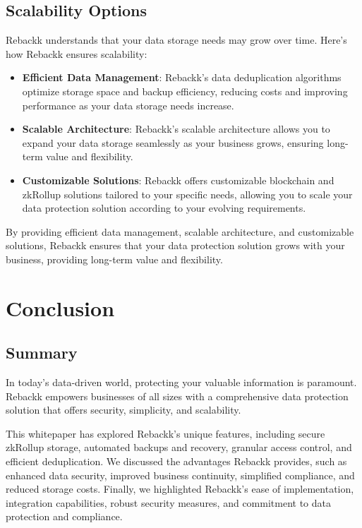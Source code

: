 \documentclass[12pt]{article}
\begin{document}
\subsection{Scalability Options}
Rebackk understands that your data storage needs may grow over time. Here's how Rebackk ensures scalability:

\begin{itemize}
    \item \textbf{Efficient Data Management}: Rebackk's data deduplication algorithms optimize storage space and backup efficiency, reducing costs and improving performance as your data storage needs increase.
    \item \textbf{Scalable Architecture}: Rebackk's scalable architecture allows you to expand your data storage seamlessly as your business grows, ensuring long-term value and flexibility.
    \item \textbf{Customizable Solutions}: Rebackk offers customizable blockchain and zkRollup solutions tailored to your specific needs, allowing you to scale your data protection solution according to your evolving requirements.
\end{itemize}
By providing efficient data management, scalable architecture, and customizable solutions, Rebackk ensures that your data protection solution grows with your business, providing long-term value and flexibility.

\section{Conclusion}
\subsection{Summary}
In today's data-driven world, protecting your valuable information is paramount. Rebackk empowers businesses of all sizes with a comprehensive data protection solution that offers security, simplicity, and scalability.

This whitepaper has explored Rebackk's unique features, including secure zkRollup storage, automated backups and recovery, granular access control, and efficient deduplication. We discussed the advantages Rebackk provides, such as enhanced data security, improved business continuity, simplified compliance, and reduced storage costs. Finally, we highlighted Rebackk's ease of implementation, integration capabilities, robust security measures, and commitment to data protection and compliance.
\end{document}
